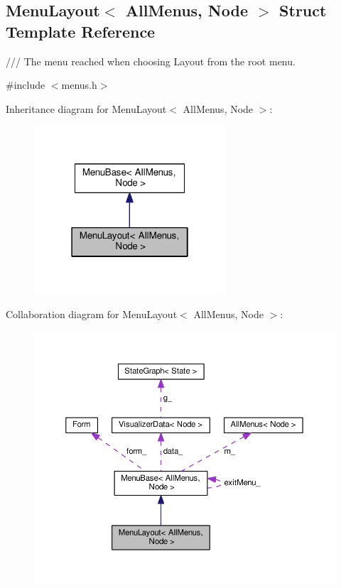 \hypertarget{structMenuLayout}{}\subsection{Menu\+Layout$<$ All\+Menus, Node $>$ Struct Template Reference}
\label{structMenuLayout}


/// The menu reached when choosing Layout from the root menu.  




{\ttfamily \#include $<$menus.\+h$>$}



Inheritance diagram for Menu\+Layout$<$ All\+Menus, Node $>$\+:\nopagebreak
\begin{figure}[H]
\begin{center}
\leavevmode
\includegraphics[width=202pt]{structMenuLayout__inherit__graph}
\end{center}
\end{figure}


Collaboration diagram for Menu\+Layout$<$ All\+Menus, Node $>$\+:\nopagebreak
\begin{figure}[H]
\begin{center}
\leavevmode
\includegraphics[width=350pt]{structMenuLayout__coll__graph}
\end{center}
\end{figure}

